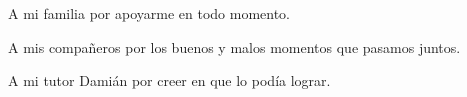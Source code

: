 \begin{acknowledgements}
    \par A mi familia por apoyarme en todo momento.
    \par A mis compa\~neros por los buenos y malos momentos que pasamos juntos.
    \par A mi tutor Dami\'an por creer en que lo pod\'ia lograr.
\end{acknowledgements}